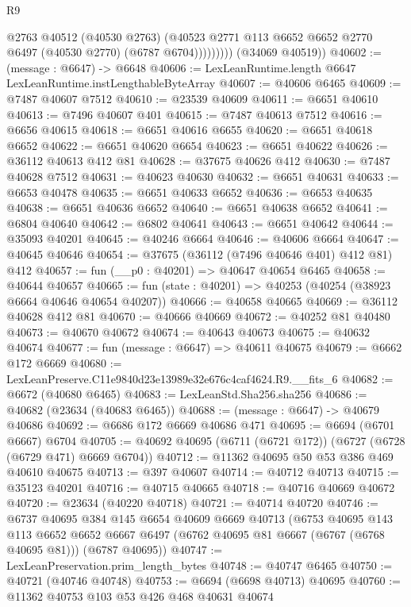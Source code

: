\begin{lexlean}{R9}
\begin{coremodule}
                    @2763
                    @40512
                    (@40530 @2763)
                    (@40523 @2771 @113 @6652 @6652 @2770 @6497 (@40530 @2770) (@6787 @6704)))))))))
      (@34069 @40519))
@40602 := (message : @6647) -> @6648
@40606 := LexLeanRuntime.length @6647 LexLeanRuntime.instLengthableByteArray
@40607 := @40606 @6465
@40609 := @7487 @40607 @7512
@40610 := @23539 @40609
@40611 := @6651 @40610
@40613 := @7496 @40607 @401
@40615 := @7487 @40613 @7512
@40616 := @6656 @40615
@40618 := @6651 @40616 @6655
@40620 := @6651 @40618 @6652
@40622 := @6651 @40620 @6654
@40623 := @6651 @40622
@40626 := @36112 @40613 @412 @81
@40628 := @37675 @40626 @412
@40630 := @7487 @40628 @7512
@40631 := @40623 @40630
@40632 := @6651 @40631
@40633 := @6653 @40478
@40635 := @6651 @40633 @6652
@40636 := @6653 @40635
@40638 := @6651 @40636 @6652
@40640 := @6651 @40638 @6652
@40641 := @6804 @40640
@40642 := @6802 @40641
@40643 := @6651 @40642
@40644 := @35093 @40201
@40645 := @40246 @6664
@40646 := @40606 @6664
@40647 := @40645 @40646
@40654 := @37675 (@36112 (@7496 @40646 @401) @412 @81) @412
@40657 := fun (__p0 : @40201) => @40647 @40654 @6465
@40658 := @40644 @40657
@40665 := fun (state : @40201) => @40253 (@40254 (@38923 @6664 @40646 @40654 @40207))
@40666 := @40658 @40665
@40669 := @36112 @40628 @412 @81
@40670 := @40666 @40669
@40672 := @40252 @81 @40480
@40673 := @40670 @40672
@40674 := @40643 @40673
@40675 := @40632 @40674
@40677 := fun (message : @6647) => @40611 @40675
@40679 := @6662 @172 @6669
@40680 := LexLeanPreserve.C11e9840d23e13989e32e676c4caf4624.R9.__fits_6
@40682 := @6672 (@40680 @6465)
@40683 := LexLeanStd.Sha256.sha256
@40686 := @40682 (@23634 (@40683 @6465))
@40688 := (message : @6647) -> @40679 @40686
@40692 := @6686 @172 @6669 @40686 @471
@40695 := @6694 (@6701 @6667) @6704
@40705 := @40692 @40695 (@6711 (@6721 @172)) (@6727 (@6728 (@6729 @471) @6669 @6704))
@40712 := @11362 @40695 @50 @53 @386 @469 @40610 @40675
@40713 := @397 @40607
@40714 := @40712 @40713
@40715 := @35123 @40201
@40716 := @40715 @40665
@40718 := @40716 @40669 @40672
@40720 := @23634 (@40220 @40718)
@40721 := @40714 @40720
@40746 := @6737
    @40695
    @384
    @145
    @6654
    @40609
    @6669
    @40713
    (@6753
      @40695
      @143
      @113
      @6652
      @6652
      @6667
      @6497
      (@6762 @40695 @81 @6667 (@6767 (@6768 @40695 @81)))
      (@6787 @40695))
@40747 := LexLeanPreservation.prim_length_bytes
@40748 := @40747 @6465
@40750 := @40721 (@40746 @40748)
@40753 := @6694 (@6698 @40713) @40695
@40760 := @11362 @40753 @103 @53 @426 @468 @40631 @40674

\end{coremodule}
\end{lexlean}
